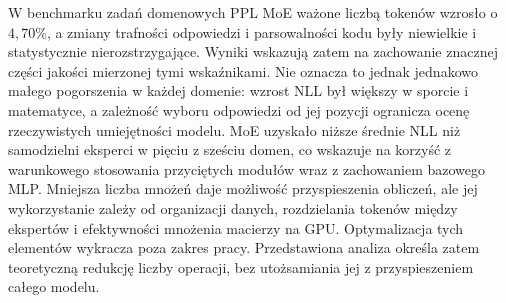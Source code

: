W benchmarku zadań domenowych PPL MoE ważone liczbą tokenów wzrosło o $4{,}70\%$, a zmiany trafności odpowiedzi i parsowalności kodu były niewielkie i statystycznie nierozstrzygające. Wyniki wskazują zatem na zachowanie znacznej części jakości mierzonej tymi wskaźnikami. Nie oznacza to jednak jednakowo małego pogorszenia w każdej domenie: wzrost NLL był większy w sporcie i matematyce, a zależność wyboru odpowiedzi od jej pozycji ogranicza ocenę rzeczywistych umiejętności modelu. MoE uzyskało niższe średnie NLL niż samodzielni eksperci w pięciu z sześciu domen, co wskazuje na korzyść z warunkowego stosowania przyciętych modułów wraz z zachowaniem bazowego MLP. \newline
Mniejsza liczba mnożeń daje możliwość przyspieszenia obliczeń, ale jej wykorzystanie zależy od organizacji danych, rozdzielania tokenów między ekspertów i efektywności mnożenia macierzy na GPU. Optymalizacja tych elementów wykracza poza zakres pracy. Przedstawiona analiza określa zatem teoretyczną redukcję liczby operacji, bez utożsamiania jej z przyspieszeniem całego modelu.
